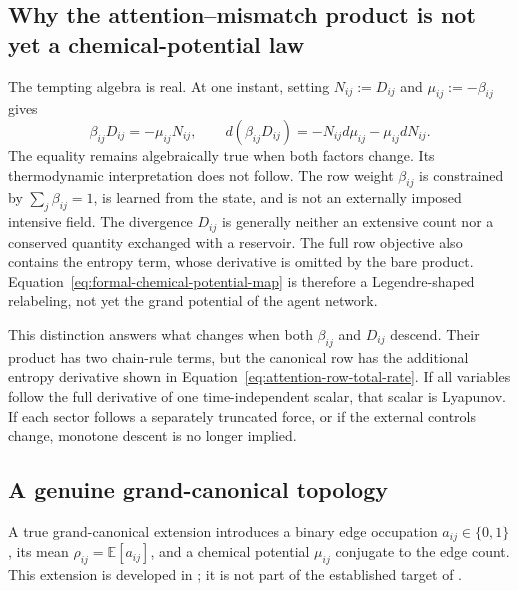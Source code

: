 \documentclass[11pt,letterpaper]{article}
\newcommand{\Ex}{\mathbb E}
\begin{document}
\subsection{Why the attention--mismatch product is not yet a chemical-potential law}

The tempting algebra is real. At one instant, setting \(N_{ij}:=D_{ij}\) and \(\mu_{ij}:=-\beta_{ij}\) gives
\begin{equation}
  \beta_{ij}D_{ij}=-\mu_{ij}N_{ij},
  \qquad
  d(\beta_{ij}D_{ij})
  =-N_{ij}d\mu_{ij}-\mu_{ij}dN_{ij}.
  \label{eq:formal-chemical-potential-map}
\end{equation}
The equality remains algebraically true when both factors change. Its thermodynamic interpretation does not follow. The row weight \(\beta_{ij}\) is constrained by \(\sum_j\beta_{ij}=1\), is learned from the state, and is not an externally imposed intensive field. The divergence \(D_{ij}\) is generally neither an extensive count nor a conserved quantity exchanged with a reservoir. The full row objective also contains the entropy term, whose derivative is omitted by the bare product. Equation~\eqref{eq:formal-chemical-potential-map} is therefore a Legendre-shaped relabeling, not yet the grand potential of the agent network.

This distinction answers what changes when both \(\beta_{ij}\) and \(D_{ij}\) descend. Their product has two chain-rule terms, but the canonical row has the additional entropy derivative shown in Equation~\eqref{eq:attention-row-total-rate}. If all variables follow the full derivative of one time-independent scalar, that scalar is Lyapunov. If each sector follows a separately truncated force, or if the external controls change, monotone descent is no longer implied.

\subsection{A genuine grand-canonical topology}

\begin{proposalbox}
A true grand-canonical extension introduces a binary edge occupation \(a_{ij}\in\{0,1\}\), its mean \(\rho_{ij}=\Ex[a_{ij}]\), and a chemical potential \(\mu_{ij}\) conjugate to the edge count. This extension is developed in ; it is not part of the established target of .
\end{proposalbox}
\end{document}
